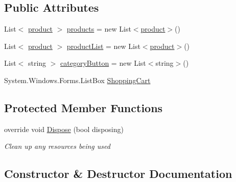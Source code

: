 \subsection*{Public Attributes}
\begin{DoxyCompactItemize}
\item 
List$<$ \mbox{\hyperlink{class_p_o_s__system_1_1product}{product}} $>$ \mbox{\hyperlink{class_p_o_s__system_1_1_p_o_s_systeminterface_ac05a15bf71763514431e992d85264ba6}{products}} = new List$<$\mbox{\hyperlink{class_p_o_s__system_1_1product}{product}}$>$()
\item 
List$<$ \mbox{\hyperlink{class_p_o_s__system_1_1product}{product}} $>$ \mbox{\hyperlink{class_p_o_s__system_1_1_p_o_s_systeminterface_a45b32825b214fe3705bf2bac5985cceb}{product\+List}} = new List$<$\mbox{\hyperlink{class_p_o_s__system_1_1product}{product}}$>$()
\item 
List$<$ string $>$ \mbox{\hyperlink{class_p_o_s__system_1_1_p_o_s_systeminterface_a4cf438601f6afe6d1fb1cf9db94f3a86}{category\+Button}} = new List$<$string$>$()
\item 
System.\+Windows.\+Forms.\+List\+Box \mbox{\hyperlink{class_p_o_s__system_1_1_p_o_s_systeminterface_a4155d18c7c9a958ad86a9a45c2943597}{Shopping\+Cart}}
\end{DoxyCompactItemize}
\subsection*{Protected Member Functions}
\begin{DoxyCompactItemize}
\item 
override void \mbox{\hyperlink{class_p_o_s__system_1_1_p_o_s_systeminterface_aa255a98c75e3bc7d6c63638642545907}{Dispose}} (bool disposing)
\begin{DoxyCompactList}\small\item\em Clean up any resources being used \end{DoxyCompactList}\end{DoxyCompactItemize}


\subsection{Constructor \& Destructor Documentation}
\mbox{\label{class_p_o_s__system_1_1_p_o_s_systeminterface_acccddaa8ea3cd9367ba18faa2a01c963}} 
